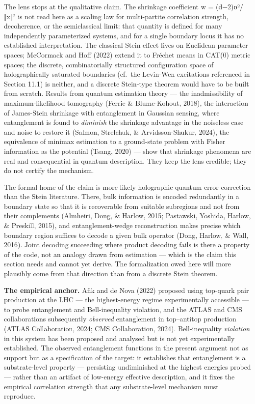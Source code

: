 \documentclass[
]{article}
\begin{document}
The lens stops at the qualitative claim. The shrinkage coefficient w =
(d−2)σ²/‖x‖² is not read here as a scaling law for multi-partite
correlation strength, decoherence, or the semiclassical limit: that
quantity is defined for many independently parameterized systems, and
for a single boundary locus it has no established interpretation. The
classical Stein effect lives on Euclidean parameter spaces; McCormack
and Hoff (2022) extend it to Fréchet means in CAT(0) metric spaces; the
discrete, combinatorially structured configuration space of
holographically saturated boundaries (cf.~the Levin-Wen excitations
referenced in Section 11.1) is neither, and a discrete Stein-type
theorem would have to be built from scratch. Results from quantum
estimation theory --- the inadmissibility of maximum-likelihood
tomography (Ferrie \& Blume-Kohout, 2018), the interaction of
James-Stein shrinkage with entanglement in Gaussian sensing, where
entanglement is found to \emph{diminish} the shrinkage advantage in the
noiseless case and noise to restore it (Salmon, Strelchuk, \&
Arvidsson-Shukur, 2024), the equivalence of minimax estimation to a
ground-state problem with Fisher information as the potential (Tsang,
2020) --- show that shrinkage phenomena are real and consequential in
quantum description. They keep the lens credible; they do not certify
the mechanism.

The formal home of the claim is more likely holographic quantum error
correction than the Stein literature. There, bulk information is encoded
redundantly in a boundary state so that it is recoverable from suitable
subregions and not from their complements (Almheiri, Dong, \& Harlow,
2015; Pastawski, Yoshida, Harlow, \& Preskill, 2015), and
entanglement-wedge reconstruction makes precise which boundary region
suffices to decode a given bulk operator (Dong, Harlow, \& Wall, 2016).
Joint decoding succeeding where product decoding fails is there a
property of the code, not an analogy drawn from estimation --- which is
the claim this section needs and cannot yet derive. The formalization
owed here will more plausibly come from that direction than from a
discrete Stein theorem.

\textbf{The empirical anchor.} Afik and de Nova (2022) proposed using
top-quark pair production at the LHC --- the highest-energy regime
experimentally accessible --- to probe entanglement and Bell-inequality
violation, and the ATLAS and CMS collaborations subsequently
\emph{observed} entanglement in top--antitop production (ATLAS
Collaboration, 2024; CMS Collaboration, 2024). Bell-inequality
\emph{violation} in this system has been proposed and analysed but is
not yet experimentally established. The observed entanglement functions
in the present argument not as support but as a specification of the
target: it establishes that entanglement is a substrate-level property
--- persisting undiminished at the highest energies probed --- rather
than an artifact of low-energy effective description, and it fixes the
empirical correlation strength that any substrate-level mechanism must
reproduce.
\end{document}
